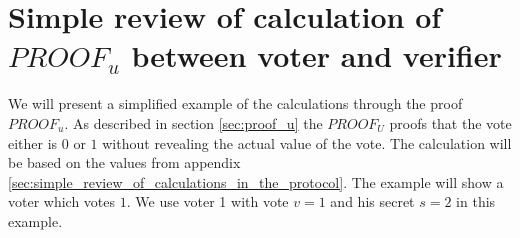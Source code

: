 \section{Simple review of calculation of $PROOF_u$ between voter and verifier}
\label{sec:simple_review_of_calculation_of_proof_u_between_voter_and_verifier}
We will present a simplified example of the calculations through the proof $PROOF_u$. As described in section  \ref{sec:proof_u} the $PROOF_U$ proofs that the vote  either is $0$ or $1$ without revealing the actual value of the vote. The calculation will be based on the values  from appendix \ref{sec:simple_review_of_calculations_in_the_protocol}. The example will show a voter which votes $1$. We use voter 1 with vote $v=1$ and his secret $s=2$ in this example.


